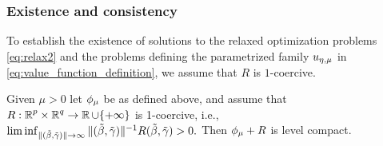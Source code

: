 \subsubsection{Existence and consistency}\label{ssec:existence and consistency}

To establish the existence of solutions to the relaxed
optimization problems \eqref{eq:relax2} and the
problems defining the parametrized family ${u_{\eta,\mu}}$ in
\eqref{eq:value_function_definition}, we assume that $R$ is $1$-coercive.
\begin{lemma}\label{lem:lb plus 1c}
Given $\mu>0$ let $\phi_\mu$ be as defined above, and assume that 
$R:{\operatorname{\mathbb{R}}^p}\times{\operatorname{\mathbb{R}}^q}\rightarrow \operatorname{\mathbb{R}}\cup\{+\infty\}$
is 1-coercive, i.e., 
\(
\liminf_{\Vert{(\tilde\beta,{\tilde{\gamma}})}\Vert\rightarrow\infty}\Vert{(\tilde\beta,{\tilde{\gamma}})}\Vert^{-1}R(\tilde\beta,{\tilde{\gamma}})>0.
\)
Then 
$\phi_\mu+R$ 
is level compact.
\end{lemma}
